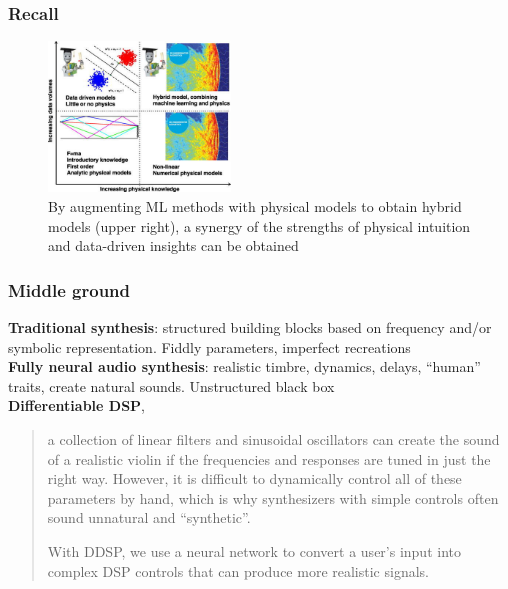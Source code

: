 \documentclass{beamer}
\begin{document}

\begin{frame}
	\frametitle{Recall}
	\begin{figure}
	\includegraphics[height=4cm]{./6_5_ml_acoustics.jpg}
		\caption{By augmenting ML methods with physical models to obtain hybrid models (upper right), a synergy of the strengths of physical intuition and data-driven insights can be obtained }
	\end{figure}
\end{frame}

\begin{frame}
\frametitle{Middle ground}
	\textbf{\textcolor{burgundy}{Traditional synthesis}}: structured building blocks based on frequency and/or symbolic representation. Fiddly parameters, imperfect recreations\\
	\textbf{\textcolor{burgundy}{Fully neural audio synthesis}}: realistic timbre, dynamics, delays, ``human'' traits, create natural sounds. Unstructured black box\\
	\textbf{\textcolor{ao(english)}{Differentiable DSP}}, 
	\begin{quote}
		a collection of linear filters and sinusoidal oscillators can create the sound of a realistic violin if the frequencies and responses are tuned in just the right way. However, it is difficult to dynamically control all of these parameters by hand, which is why synthesizers with simple controls often sound unnatural and ``synthetic''.

		With DDSP, we use a neural network to convert a user's input into complex DSP controls that can produce more realistic signals.
	\end{quote}
\end{frame}
\end{document}
